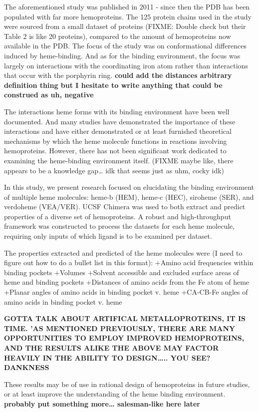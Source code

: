 \documentclass[a4paper, nobind]{templates/ociamthesis}
\begin{document}
The aforementioned study was published in 2011 - since then the PDB has been populated with far more hemoproteins. The 125 protein chains used in the study were sourced from a small dataset of proteins (FIXME: Double check but their Table 2 is like 20 proteins), compared to the amount of hemoproteins now available in the PDB. The focus of the study was on conformational differences induced by heme-binding. And as for the binding environment, the focus was largely on interactions with the coordinating iron atom rather than interactions that occur with the porphyrin ring. \textbf{could add the distances arbitrary definition thing but I hesitate to write anything that could be construed as uh, negative}

The interactions heme forms with its binding environment have been well documented. And many studies have demonstrated the importance of these interactions and have either demonstrated or at least furnished theoretical mechanisms by which the heme molecule functions in reactions involving hemoproteins. However, there has not been significant work dedicated to examining the heme-binding environment itself. (FIXME maybe like, there appears to be a knowledge gap\ldots{} idk that seems just as uhm, cocky idk)

In this study, we present research focused on elucidating the binding environment of multiple heme molecules: heme-b (HEM), heme-c (HEC), siroheme (SER), and verdoheme (VEA/VER). UCSF Chimera was used to both extract and predict properties of a diverse set of hemoproteins. A robust and high-throughput framework was constructed to process the datasets for each heme molecule, requiring only inputs of which ligand is to be examined per dataset.

The properties extracted and predicted of the heme molecules were (I need to figure out how to do a bullet list in this format):
+Amino acid frequencies within binding pockets
+Volumes
+Solvent accessible and excluded surface areas of heme and binding pockets
+Distances of amino acids from the Fe atom of heme
+Planar angles of amino acids in binding pocket v. heme
+CA-CB-Fe angles of amino acids in binding pocket v. heme

\textbf{GOTTA TALK ABOUT ARTIFICAL METALLOPROTEINS, IT IS TIME. 'AS MENTIONED PREVIOUSLY, THERE ARE MANY OPPORTUNITIES TO EMPLOY IMPROVED HEMOPROTEINS, AND THE RESULTS ALIKE THE ABOVE MAY FACTOR HEAVILY IN THE ABILITY TO DESIGN\ldots.. YOU SEE? DANKNESS}

These results may be of use in rational design of hemoproteins in future studies, or at least improve the understanding of the heme binding environment. \textbf{probably put something more\ldots{} salesman-like here later}
\end{document}
